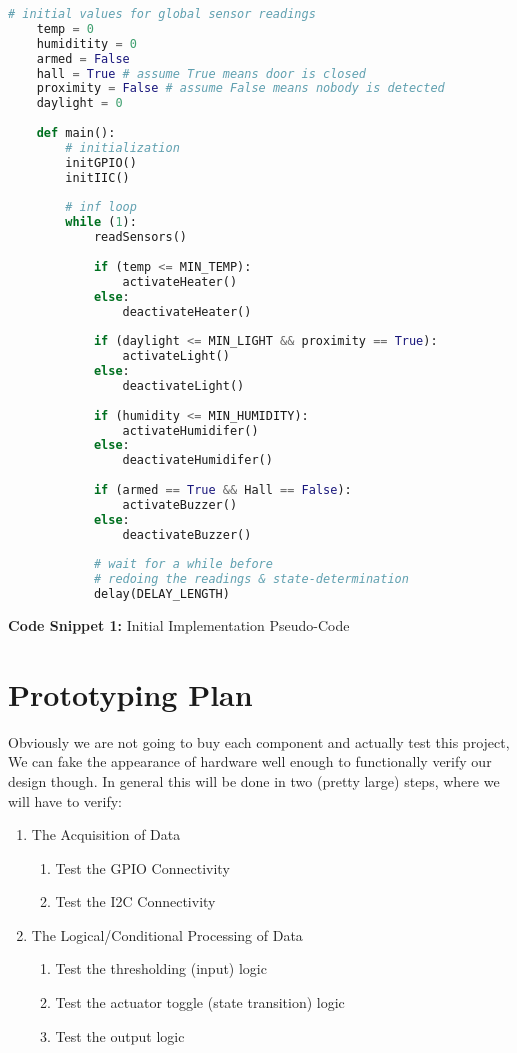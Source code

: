 \documentclass[]{report}
\begin{document}
\newpage
\begin{center}
\begin{lstlisting}[language=python]
	# initial values for global sensor readings
	temp = 0
	humiditity = 0
	armed = False
	hall = True # assume True means door is closed
	proximity = False # assume False means nobody is detected
	daylight = 0
	
	def main():
		# initialization
		initGPIO()
		initIIC()
	
		# inf loop
		while (1):
			readSensors()
			
			if (temp <= MIN_TEMP):
				activateHeater()
			else:
				deactivateHeater()
			
			if (daylight <= MIN_LIGHT && proximity == True):
				activateLight()
			else:
				deactivateLight()
			
			if (humidity <= MIN_HUMIDITY):
				activateHumidifer()
			else:
				deactivateHumidifer()
			
			if (armed == True && Hall == False):
				activateBuzzer()
			else:
				deactivateBuzzer()
			
			# wait for a while before 
			# redoing the readings & state-determination
			delay(DELAY_LENGTH)
\end{lstlisting}
\vspace{1em}
\textbf{Code Snippet 1:} Initial Implementation Pseudo-Code 

\end{center}

\section*{Prototyping Plan}

Obviously we are not going to buy each component and actually test this project, We can fake the appearance of hardware well enough to functionally verify our design though. In general this will be done in two (pretty large) steps, where we will have to verify:
\begin{enumerate}
	\item The Acquisition of Data
	\begin{enumerate}
		\item Test the GPIO Connectivity
		\item Test the I2C Connectivity
	\end{enumerate}
	\item The Logical/Conditional Processing of Data
	\begin{enumerate}
		\item Test the thresholding (input) logic
		\item Test the actuator toggle (state transition) logic
		\item Test the output logic
	\end{enumerate}
\end{enumerate} 
\end{document}
